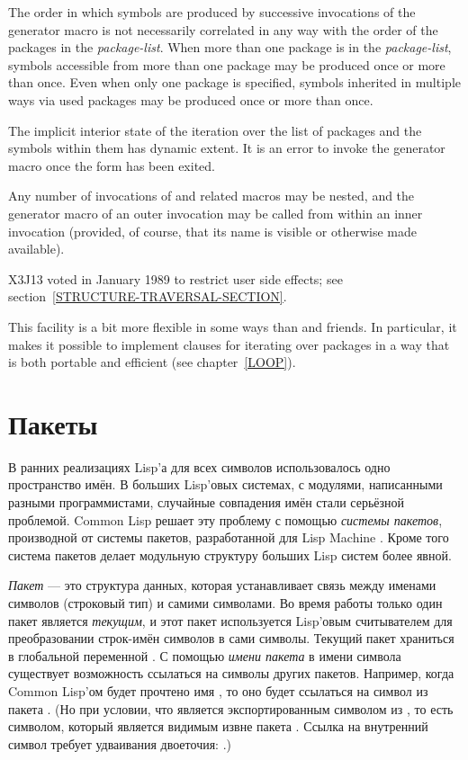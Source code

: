 \begin{defmac}
The order in which symbols are produced by successive invocations
of the generator macro is not necessarily correlated in any way
with the order of the packages in the \emph{package-list}.
When more than one package is in the \emph{package-list},
symbols accessible from more than one package may be produced
once or more than once.  Even when only one package is specified,
symbols inherited in multiple ways via used packages may be
produced once or more than once.

The implicit interior state of the iteration over the list of packages
and the symbols within them has dynamic extent.
It is an error to invoke the generator macro
once the  form has been exited.

Any number of invocations of 
and related macros may be nested, and the generator macro of an
outer invocation may be called from within an inner invocation
(provided, of course, that its name is visible or otherwise made available).

X3J13 voted in January 1989
to restrict user side effects; see section~\ref{STRUCTURE-TRAVERSAL-SECTION}.

\beforenoterule
\begin{rationale}
This facility is a bit more flexible in some ways than 
and friends.
In particular, it makes it possible to implement 
clauses for iterating over packages in a way that is both portable
and efficient (see chapter~\ref{LOOP}).
\end{rationale}
\afternoterule
\end{defmac}

\else

\chapter{Пакеты}
\label{XPACK}

В ранних реализациях Lisp'а для всех символов использовалось одно
пространство имён. В больших Lisp'овых системах, с модулями,
написанными разными программистами, случайные совпадения имён стали
серьёзной проблемой. Common Lisp решает эту проблему с помощью
\emph{системы пакетов}, производной от системы пакетов, разработанной
для Lisp Machine \cite{BLUE-LISPM}. Кроме того система пакетов делает
модульную структуру больших Lisp систем более явной.

\emph{Пакет} --- это структура данных, которая устанавливает связь
между именами символов (строковый тип) и самими символами. Во время
работы только один пакет является \emph{текущим}, и этот пакет
используется Lisp'овым считывателем для преобразовании строк-имён
символов в сами символы. Текущий пакет храниться в глобальной
переменной . С помощью \emph{имени пакета} в имени
символа существует возможность ссылаться на символы других пакетов.
Например, когда Common Lisp'ом будет прочтено имя , то оно
будет ссылаться на символ  из пакета .  (Но при
условии, что  является экспортированным символом из ,
то есть символом, который является видимым извне пакета
. Ссылка на внутренний символ требует удваивания двоеточия:
.)

